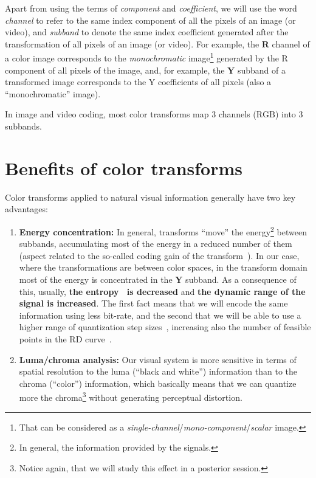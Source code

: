 Apart from using the terms of \emph{component} and \emph{coefficient},
we will use the word \emph{channel} to refer to the same index
component of all the pixels of an image (or video), and \emph{subband}
to denote the same index coefficient generated after the
transformation of all pixels of an image (or video). For example, the
$\mathbf{R}$ channel of a color image corresponds to the
\emph{monochromatic} image\footnote{That can be considered as a
  \emph{single-channel}/\emph{mono-component}/\emph{scalar} image.}
generated by the $\text{R}$ component of all pixels of the image, and,
for example, the $\mathbf{Y}$ subband of a transformed image
corresponds to the $\text{Y}$ coefficients of all pixels (also a
``monochromatic'' image).

In image and video coding, most color transforms map 3 channels
($\text{RGB}$) into 3 subbands.

\section{Benefits of color transforms}

Color transforms applied to natural visual information generally have
two key advantages:
\begin{enumerate}
\item \textbf{Energy concentration:} In general, transforms ``move''
  the energy\footnote{In general, the information provided by the
    signals.} between subbands, accumulating most of the energy in a
  reduced number of them (aspect related to the so-called coding gain
  of the transform~\cite{vruiz__transform_coding}). In our case, where
  the transformations are between color spaces, in the transform
  domain most of the energy is concentrated in the $\mathbf{Y}$
  subband. As a consequence of this, usually, \textbf{the
    entropy~\cite{vruiz__information_theory} is decreased} and
  \textbf{the dynamic range of the signal is increased}. The first
  fact means that we will encode the same information using less
  bit-rate, and the second that we will be able to use a higher range
  of quantization step
  sizes~\cite{vruiz__scalar_quantization,sayood2017introduction},
  increasing also the number of feasible points in the RD
  curve~\cite{vruiz__information_theory}.
\item \textbf{Luma/chroma analysis:} Our visual system is more
  sensitive in terms of spatial resolution to the luma
  (``black and white'') information than to the chroma (``color'')
  information, which basically means that we can quantize more the
  chroma\footnote{Notice again, that we will study this effect in a
  posterior session.} without generating perceptual distortion. 
\end{enumerate}

